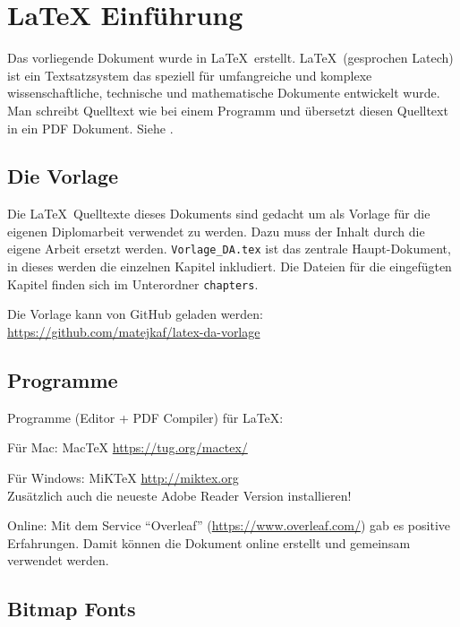 \chapter{LaTeX Einführung}

Das vorliegende Dokument wurde in \LaTeX\ erstellt.
\LaTeX\ (gesprochen Latech) ist ein Textsatzsystem das speziell für umfangreiche  und komplexe wissenschaftliche, technische und mathematische Dokumente entwickelt wurde.
Man schreibt Quelltext wie bei einem Programm und übersetzt diesen Quelltext in ein PDF Dokument.
Siehe \cite{bib:latexintro}.
 
\section{Die Vorlage}

Die \LaTeX\ Quelltexte dieses Dokuments sind gedacht um als Vorlage für die eigenen Diplomarbeit verwendet zu werden.
Dazu muss der Inhalt durch die eigene Arbeit ersetzt werden.
\verb+Vorlage_DA.tex+ ist das zentrale Haupt-Dokument, in dieses werden die einzelnen Kapitel inkludiert. Die Dateien für die eingefügten Kapitel finden sich im Unterordner \verb+chapters+.

Die Vorlage kann von GitHub geladen werden:
\url{https://github.com/matejkaf/latex-da-vorlage}

\section{Programme}

Programme (Editor + PDF Compiler) für \LaTeX:

Für Mac: MacTeX
\url{https://tug.org/mactex/}

Für Windows: MiKTeX
\url{http://miktex.org}\\
Zusätzlich auch die neueste Adobe Reader Version installieren!

Online:
Mit dem Service "`Overleaf"' (\url{https://www.overleaf.com/}) gab es positive Erfahrungen. Damit können die Dokument online erstellt und gemeinsam verwendet werden.



\section{Bitmap Fonts}


